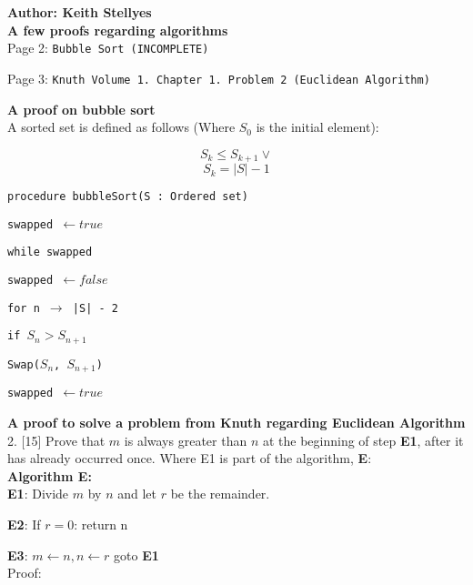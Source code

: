 \documentclass{article}
\begin{document}
	
\textbf{\LARGE Author: Keith Stellyes}\\

\textbf{\Large A few proofs regarding algorithms}\\

Page 2: \texttt{Bubble Sort (INCOMPLETE)}

Page 3: \texttt{Knuth Volume 1. Chapter 1. Problem 2 (Euclidean Algorithm)}

\newpage

\textbf{\Large A proof on bubble sort}\\


A sorted set is defined as follows (Where $S_{0}$ is the initial element): 

$$S_{k} \leq S_{k + 1} \vee$$ 
$$S_{k} = |S| - 1$$

\texttt{procedure bubbleSort(S : Ordered set)}

\qquad\texttt{swapped $\leftarrow true$}

\qquad\texttt{while swapped}

\qquad\qquad\texttt{swapped $\leftarrow false$}

\qquad\qquad\texttt{for n $\rightarrow$ |S| - 2}

\qquad\qquad\qquad\texttt{if $S_{n} >  S_{n + 1}$}

\qquad\qquad\qquad\qquad\texttt{Swap($S_{n}$, $S_{n + 1}$)}

\qquad\qquad\qquad\qquad\texttt{swapped $\leftarrow true$}

\newpage

\textbf{\Large A proof to solve a problem from Knuth regarding Euclidean Algorithm}\\

2. [15] Prove that $m$ is always greater than $n$ at the beginning of step \textbf{E1}, after it has already occurred once. Where E1 is part of the algorithm, \textbf{E}:\\

\textbf{Algorithm E:}\\

\textbf{E1}: Divide $m$ by $n$ and let $r$ be the remainder.

\textbf{E2}: If $r = 0$: return n

\textbf{E3}: $m \leftarrow n , n \leftarrow r$ goto \textbf{E1}\\

Proof:\\
\end{document}
